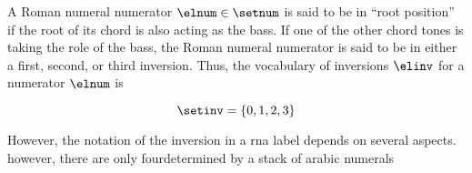 
A Roman numeral numerator $\elnum \in \setnum$ is said to be
in ``root position'' if the root of its chord is also acting
as the bass. If one of the other chord tones is taking the
role of the bass, the Roman numeral numerator is said to be
in either a first, second, or third inversion. Thus, the
vocabulary of inversions $\elinv$ for a numerator $\elnum$
is 

\begin{equation}
    \label{eq:inversion_vocabulary}
    \setinv = \{ 0, 1, 2, 3 \}
\end{equation}


However, the notation of the inversion in a \gls{rna} label
depends on several aspects. however, there are only
fourdetermined by a stack of arabic numerals


        
